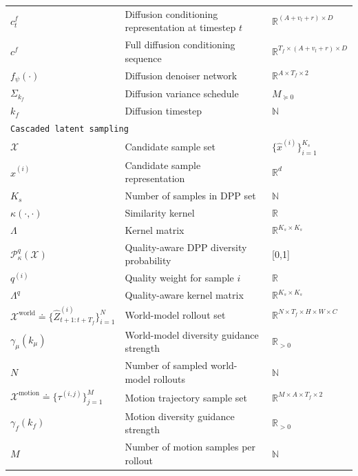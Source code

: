 \documentclass[runningheads]{llncs}
\begin{document}
{\begin{longtable}{lll}
$c_t^f$ & Diffusion conditioning representation at timestep $t$ & $\mathbb{R}^{(A+v_l+r) \times D}$ \\

$c^f$ & Full diffusion conditioning sequence & $\mathbb{R}^{T_f \times (A+v_l+r) \times D}$ \\

$f_\psi(\cdot)$ & Diffusion denoiser network & $\mathbb{R}^{A \times T_f \times 2}$ \\

$\Sigma_{k_f}$ & Diffusion variance schedule & $M_{\succeq 0}$ \\

$k_f$ & Diffusion timestep & $\mathbb N$ \\

\midrule
\multicolumn{3}{l}{\texttt{Cascaded latent sampling}} \\

$\mathcal{X}$ & Candidate sample set & $\{\hat{x}^{(i)}\}_{i=1}^{K_s}$ \\

$\hat{x}^{(i)}$ & Candidate sample representation & $\mathbb{R}^{d}$ \\

$K_s$ & Number of samples in DPP set & $\mathbb N$\\

$\kappa(\cdot,\cdot)$ & Similarity kernel & $\mathbb{R}$ \\

$\Lambda$ & Kernel matrix & $\mathbb{R}^{K_s \times K_s}$ \\

$\mathcal{P}^q_\kappa(\mathcal{X})$ &  Quality-aware DPP diversity probability & [0,1] \\

$q^{(i)}$ & Quality weight for sample $i$ & $\mathbb {R}$ \\

$\Lambda^q$ & Quality-aware kernel matrix & $\mathbb{R}^{K_s \times K_s}$ \\

$\mathcal{X}^{\text{world}}\!\doteq\!\{\hat{Z}^{(i)}_{t+1:t+T_f}\}_{i=1}^N$ & World-model rollout set &  $\mathbb{R}^{N\times T_f \times H \times W \times C}$\\

$\gamma_\mu(k_\mu)$ & World-model diversity guidance strength & $\mathbb R_{>0}$ \\

$N$ & Number of sampled world-model rollouts & $\mathbb N$ \\

$\mathcal{X}^{\text{motion}}\doteq \{\tau^{(i,j)}\}_{j=1}^M$ & Motion trajectory sample set &  $\mathbb{R}^{M\times A \times T_f \times 2}$\\

$\gamma_f(k_f)$ & Motion diversity guidance strength & $\mathbb R_{>0}$ \\

$M$ & Number of motion samples per rollout & $\mathbb N$ \\
\end{longtable}
}
\end{document}
